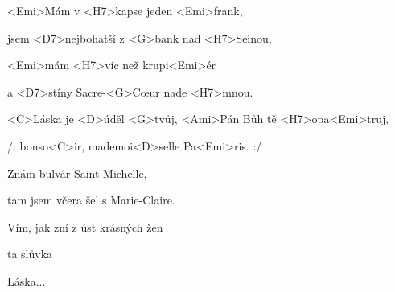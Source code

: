

\zs
<Emi>Mám v <H7>kapse jeden <Emi>frank,

jsem <D7>nejbohatší z <G>bank nad <H7>Seinou,

<Emi>mám <H7>víc než krupi<Emi>ér

a <D7>stíny Sacre-<G>Cœur nade <H7>mnou.
\ks

\zr
<C>Láska je <D>úděl <G>tvůj, <Ami>Pán Bůh tě <H7>opa<Emi>truj,

/: bonso<C>ir, mademoi<D>selle Pa<Emi>ris. :/
\kr

\zs
Znám bulvár Saint Michelle,

tam jsem včera šel s Marie-Claire.

Vím, jak zní z úst krásných žen

ta slůvka 
\ks

\zr
Láska...
\kr

\kp
